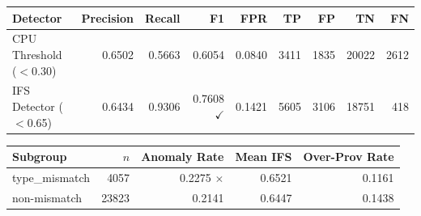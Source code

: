 \begin{tabular}{lrrrrrrrr}
\toprule
\textbf{Detector} & \textbf{Precision} & \textbf{Recall} & \textbf{F1} & \textbf{FPR} & \textbf{TP} & \textbf{FP} & \textbf{TN} & \textbf{FN} \\
\midrule

CPU Threshold ($<$0.30) & 0.6502 & 0.5663 & 0.6054 & 0.0840 & 3411 & 1835 & 20022 & 2612 \\
IFS Detector ($<$0.65) & 0.6434 & 0.9306 & 0.7608 $\checkmark$ & 0.1421 & 5605 & 3106 & 18751 & 418 \\
\bottomrule
\end{tabular}


\begin{tabular}{lrrrr}
\toprule
\textbf{Subgroup} & \textbf{$n$} & \textbf{Anomaly Rate} & \textbf{Mean IFS} & \textbf{Over-Prov Rate} \\
\midrule

type\_mismatch & 4057 & 0.2275 $\times$ & 0.6521 & 0.1161 \\
non-mismatch & 23823 & 0.2141 & 0.6447 & 0.1438 \\
\bottomrule
\end{tabular}
